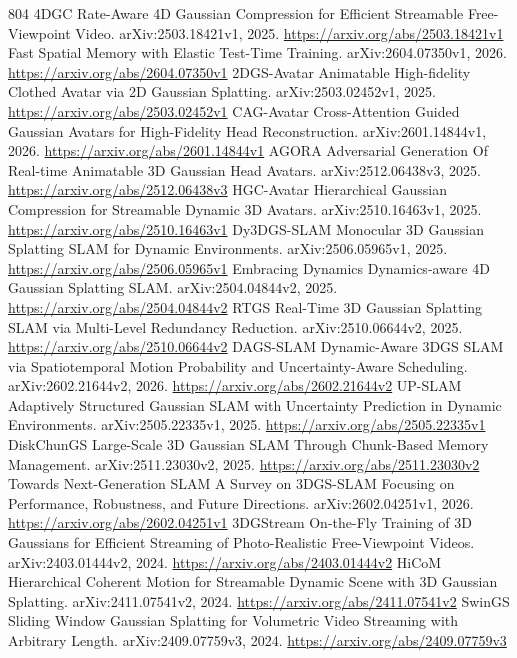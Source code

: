 \documentclass[11pt]{article}
\begin{document}
\begin{thebibliography}{804}
 4DGC Rate-Aware 4D Gaussian Compression for Efficient Streamable Free-Viewpoint Video. arXiv:2503.18421v1, 2025. \url{https://arxiv.org/abs/2503.18421v1}
 Fast Spatial Memory with Elastic Test-Time Training. arXiv:2604.07350v1, 2026. \url{https://arxiv.org/abs/2604.07350v1}
 2DGS-Avatar Animatable High-fidelity Clothed Avatar via 2D Gaussian Splatting. arXiv:2503.02452v1, 2025. \url{https://arxiv.org/abs/2503.02452v1}
 CAG-Avatar Cross-Attention Guided Gaussian Avatars for High-Fidelity Head Reconstruction. arXiv:2601.14844v1, 2026. \url{https://arxiv.org/abs/2601.14844v1}
 AGORA Adversarial Generation Of Real-time Animatable 3D Gaussian Head Avatars. arXiv:2512.06438v3, 2025. \url{https://arxiv.org/abs/2512.06438v3}
 HGC-Avatar Hierarchical Gaussian Compression for Streamable Dynamic 3D Avatars. arXiv:2510.16463v1, 2025. \url{https://arxiv.org/abs/2510.16463v1}
 Dy3DGS-SLAM Monocular 3D Gaussian Splatting SLAM for Dynamic Environments. arXiv:2506.05965v1, 2025. \url{https://arxiv.org/abs/2506.05965v1}
 Embracing Dynamics Dynamics-aware 4D Gaussian Splatting SLAM. arXiv:2504.04844v2, 2025. \url{https://arxiv.org/abs/2504.04844v2}
 RTGS Real-Time 3D Gaussian Splatting SLAM via Multi-Level Redundancy Reduction. arXiv:2510.06644v2, 2025. \url{https://arxiv.org/abs/2510.06644v2}
 DAGS-SLAM Dynamic-Aware 3DGS SLAM via Spatiotemporal Motion Probability and Uncertainty-Aware Scheduling. arXiv:2602.21644v2, 2026. \url{https://arxiv.org/abs/2602.21644v2}
 UP-SLAM Adaptively Structured Gaussian SLAM with Uncertainty Prediction in Dynamic Environments. arXiv:2505.22335v1, 2025. \url{https://arxiv.org/abs/2505.22335v1}
 DiskChunGS Large-Scale 3D Gaussian SLAM Through Chunk-Based Memory Management. arXiv:2511.23030v2, 2025. \url{https://arxiv.org/abs/2511.23030v2}
 Towards Next-Generation SLAM A Survey on 3DGS-SLAM Focusing on Performance, Robustness, and Future Directions. arXiv:2602.04251v1, 2026. \url{https://arxiv.org/abs/2602.04251v1}
 3DGStream On-the-Fly Training of 3D Gaussians for Efficient Streaming of Photo-Realistic Free-Viewpoint Videos. arXiv:2403.01444v2, 2024. \url{https://arxiv.org/abs/2403.01444v2}
 HiCoM Hierarchical Coherent Motion for Streamable Dynamic Scene with 3D Gaussian Splatting. arXiv:2411.07541v2, 2024. \url{https://arxiv.org/abs/2411.07541v2}
 SwinGS Sliding Window Gaussian Splatting for Volumetric Video Streaming with Arbitrary Length. arXiv:2409.07759v3, 2024. \url{https://arxiv.org/abs/2409.07759v3}

\end{thebibliography}
\end{document}
